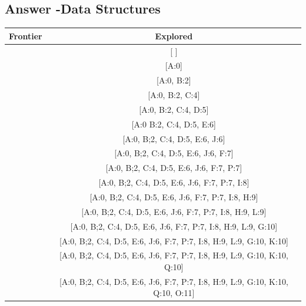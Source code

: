 \documentclass{article}
\begin{document}
\subsection{Answer -Data Structures}
\begin{center}
    \begin{tabular}{ l | c}
    
    \hline
    \textbf{Frontier} & \textbf{Explored}\\
    
    \hline
    [A:0] &  [ ] \\ \hline 
    [B:2, C:4, D:6] & [A:0] \\ \hline
    [C:4, D:6, E:9] & [A:0, B:2] \\ \hline
    [D:5, E:6] & [A:0, B:2, C:4] \\ \hline
    [E:6, J:6, F:8, H:9] & [A:0, B:2, C:4, D:5] \\ \hline
    [J:6, F:7, P:7, H:9, I:9, G:11] & [A:0 B:2, C:4, D:5, E:6] \\ \hline
    [F:7, P:7, H:9, I:9, G:11] & [A:0, B;2, C:4, D:5, E:6, J:6] \\ \hline
    [P:7, H:9, I:9, L:9, G:10, M:12] & [A:0, B;2, C:4, D:5, E:6, J:6, F:7] \\ \hline
    [I:8, H:9, L:9, G:10, M:12] & [A:0, B;2, C:4, D:5, E:6, J:6, F:7, P:7] \\ \hline
    [H:9, L:9, G:10, Q:10, O:11, M:12] & [A:0, B;2, C:4, D:5, E:6, J:6, F:7, P:7, I:8] \\ \hline
    [L:9, G:10, K:10, Q:10, O:11, M:12] & [A:0, B;2, C:4, D:5, E:6, J:6, F:7, P:7, I:8, H:9] \\ \hline
    [G:10, K:10, Q:10, O:11, M:12] & [A:0, B;2, C:4, D:5, E:6, J:6, F:7, P:7, I:8, H:9, L:9] \\ \hline
    [K:10, Q:10, O:11, M:12] & [A:0, B;2, C:4, D:5, E:6, J:6, F:7, P:7, I:8, H:9, L:9, G:10] \\ \hline
    [Q:10, O:11, M:12] & [A:0, B;2, C:4, D:5, E:6, J:6, F:7, P:7, I:8, H:9, L:9, G:10, K:10] \\ \hline
    [O:11, M:12] & [A:0, B;2, C:4, D:5, E:6, J:6, F:7, P:7, I:8, H:9, L:9, G:10, K:10, Q:10] \\ \hline
    [M:12] & [A:0, B;2, C:4, D:5, E:6, J:6, F:7, P:7, I:8, H:9, L:9, G:10, K:10, Q:10, O:11] \\ \hline
        
    \end{tabular}
\end{center}  
\end{document}
